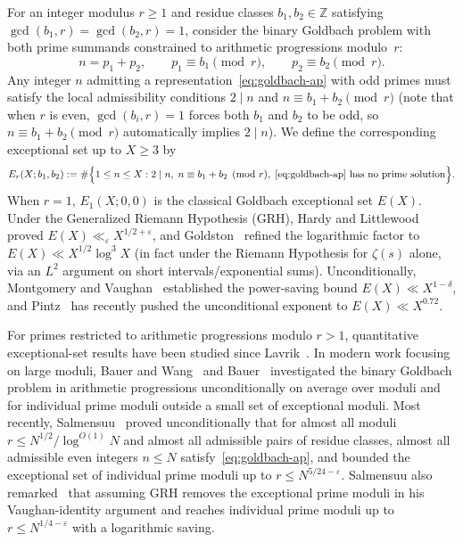 \documentclass[11pt,reqno]{amsart}
\numberwithin{equation}{section}
\theoremstyle{definition}
\newcommand{\Z}{\mathbb{Z}}
\newcommand{\1}{\mathbf{1}}
\newcommand{\GRH}{\textup{GRH}}
\begin{document}
For an integer modulus $r \ge 1$ and residue classes $b_1, b_2 \in \Z$ satisfying $\gcd(b_1, r) = \gcd(b_2, r) = 1$, consider the binary Goldbach problem with both prime summands constrained to arithmetic progressions modulo~$r$:
\begin{equation}\label{eq:goldbach-ap}
  n = p_1 + p_2, \qquad p_1 \equiv b_1 \pmod r, \qquad p_2 \equiv b_2 \pmod r.
\end{equation}
Any integer $n$ admitting a representation~\eqref{eq:goldbach-ap} with odd primes must satisfy the local admissibility conditions $2 \mid n$ and $n \equiv b_1 + b_2 \pmod r$ (note that when $r$ is even, $\gcd(b_i, r) = 1$ forces both $b_1$ and $b_2$ to be odd, so $n \equiv b_1 + b_2 \pmod r$ automatically implies $2 \mid n$). We define the corresponding exceptional set up to $X \ge 3$ by
\begin{equation}\label{eq:exceptional-def}
  E_r(X; b_1, b_2) := \#\Big\{1 \le n \le X : 2 \mid n,\; n \equiv b_1 + b_2 \pmod r,\; \text{\eqref{eq:goldbach-ap} has no prime solution}\Big\}.
\end{equation}
When $r = 1$, $E_1(X; 0, 0)$ is the classical Goldbach exceptional set $E(X)$. Under the Generalized Riemann Hypothesis (\GRH{}), Hardy and Littlewood~\cite{HardyLittlewood1924} proved $E(X) \ll_\varepsilon X^{1/2+\varepsilon}$, and Goldston~\cite{Goldston1992} refined the logarithmic factor to $E(X) \ll X^{1/2}\log^3 X$ (in fact under the Riemann Hypothesis for $\zeta(s)$ alone, via an $L^2$ argument on short intervals/exponential sums). Unconditionally, Montgomery and Vaughan~\cite{MontgomeryVaughan1975} established the power-saving bound $E(X) \ll X^{1-\delta}$, and Pintz~\cite{Pintz2023PartI,Pintz2018PartII} has recently pushed the unconditional exponent to $E(X) \ll X^{0.72}$.

For primes restricted to arithmetic progressions modulo $r > 1$, quantitative exceptional-set results have been studied since Lavrik~\cite{Lavrik1961}. In modern work focusing on large moduli, Bauer and Wang~\cite{BauerWang2013} and Bauer~\cite{Bauer2017} investigated the binary Goldbach problem in arithmetic progressions unconditionally on average over moduli and for individual prime moduli outside a small set of exceptional moduli. Most recently, Salmensuu~\cite{Salmensuu2022} proved unconditionally that for almost all moduli $r \le N^{1/2}/\log^{O(1)} N$ and almost all admissible pairs of residue classes, almost all admissible even integers $n \le N$ satisfy~\eqref{eq:goldbach-ap}, and bounded the exceptional set of individual prime moduli up to $r \le N^{5/24-\varepsilon}$. Salmensuu also remarked~\cite{Salmensuu2022} that assuming \GRH{} removes the exceptional prime moduli in his Vaughan-identity argument and reaches individual prime moduli up to $r \le N^{1/4-\varepsilon}$ with a logarithmic saving.
\end{document}

